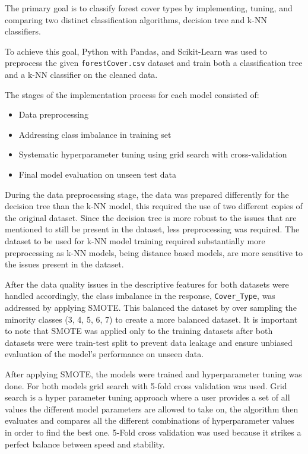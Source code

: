 \documentclass[conference]{IEEEtran}
\begin{document}
The primary goal is to classify forest cover types by implementing, tuning, and comparing two distinct classification algorithms, decision tree and k-NN classifiers.

To achieve this goal, Python with Pandas, and Scikit-Learn was used to preprocess the given \texttt{forestCover.csv} dataset and train both a classification tree and a k-NN classifier on the cleaned data.

The stages of the implementation process for each model consisted of: 

\begin{itemize}
    \item Data preprocessing
    \item Addressing class imbalance in training set
    \item Systematic hyperparameter tuning using grid search with cross-validation
    \item Final model evaluation on unseen test data
\end{itemize}

During the data preprocessing stage, the data was prepared differently for the decision tree than the k-NN model, this required the use of two different copies of the original dataset. Since the decision tree is more robust to the issues that are mentioned to still be present in the dataset, less preprocessing was required. The dataset to be used for k-NN model training required substantially more preprocessing as k-NN models, being distance based models, are more sensitive to the issues present in the dataset.

After the data quality issues in the descriptive features for both datasets were handled accordingly, the class imbalance in the response, \texttt{Cover\_Type}, was addressed by applying SMOTE. This balanced the dataset by over sampling the minority classes (3, 4, 5, 6, 7) to create a more balanced dataset. It is important to note that SMOTE was applied only to the training datasets after both datasets were were train-test split to prevent data leakage and ensure unbiased evaluation of the model's performance on unseen data.

After applying SMOTE, the models were trained and hyperparameter tuning was done. For both models grid search with 5-fold cross validation was used. Grid search is a hyper parameter tuning approach where a user provides a set of all values the different model parameters are allowed to take on, the algorithm then evaluates and compares all the different combinations of hyperparameter values in order to find the best one. 5-Fold cross validation was used because it strikes a perfect balance between speed and stability.
\end{document}

